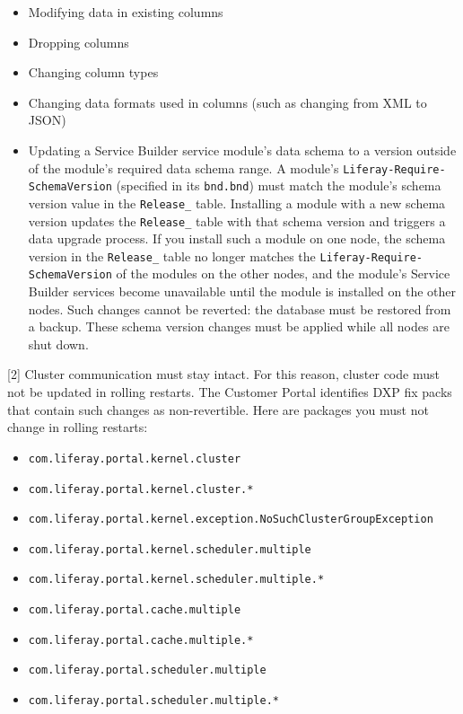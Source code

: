 \begin{itemize}
\tightlist
\item
  Modifying data in existing columns
\item
  Dropping columns
\item
  Changing column types
\item
  Changing data formats used in columns (such as changing from XML to
  JSON)
\item
  Updating a Service Builder service module's data schema to a version
  outside of the module's required data schema range. A module's
  \texttt{Liferay-Require-SchemaVersion} (specified in its
  \texttt{bnd.bnd}) must match the module's schema version value in the
  \texttt{Release\_} table. Installing a module with a new schema
  version updates the \texttt{Release\_} table with that schema version
  and triggers a data upgrade process. If you install such a module on
  one node, the schema version in the \texttt{Release\_} table no longer
  matches the \texttt{Liferay-Require-SchemaVersion} of the modules on
  the other nodes, and the module's Service Builder services become
  unavailable until the module is installed on the other nodes. Such
  changes cannot be reverted: the database must be restored from a
  backup. These schema version changes must be applied while all nodes
  are shut down.
\end{itemize}

{[}2{]} Cluster communication must stay intact. For this reason, cluster
code must not be updated in rolling restarts. The Customer Portal
identifies DXP fix packs that contain such changes as non-revertible.
Here are packages you must not change in rolling restarts:

\begin{itemize}
\tightlist
\item
  \texttt{com.liferay.portal.kernel.cluster}
\item
  \texttt{com.liferay.portal.kernel.cluster.*}
\item
  \texttt{com.liferay.portal.kernel.exception.NoSuchClusterGroupException}
\item
  \texttt{com.liferay.portal.kernel.scheduler.multiple}
\item
  \texttt{com.liferay.portal.kernel.scheduler.multiple.*}
\item
  \texttt{com.liferay.portal.cache.multiple}
\item
  \texttt{com.liferay.portal.cache.multiple.*}
\item
  \texttt{com.liferay.portal.scheduler.multiple}
\item
  \texttt{com.liferay.portal.scheduler.multiple.*}
\end{itemize}


